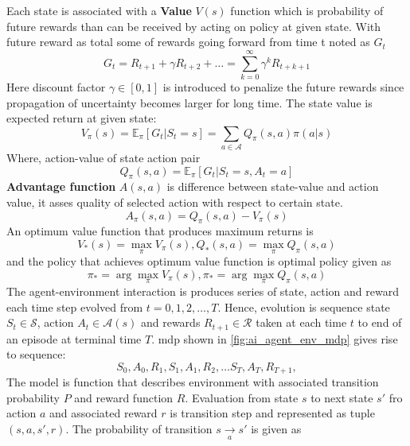 Each state is associated with a \textbf{Value} $V(s)$ function which is probability of future rewards than can be received by acting on policy at given state. With future reward as total some of rewards going forward from time t noted as $G_t$
\begin{equation}
    G_t = R_{t+1} + \gamma R_{t+2} + \dots = \sum_{k=0}^{\infty} \gamma^k R_{t+k+1}
\end{equation}
Here discount factor $\gamma \in [0,1]$ is introduced to  penalize the future rewards since propagation of uncertainty becomes larger for long time. The state value is expected return at given state:
\begin{equation}
    V_{\pi}(s) = \mathbb{E}_{\pi}[G_t \vert S_t = s] = \sum_{a \in \mathcal{A}} Q_{\pi}(s, a) \pi(a \vert s)
\end{equation}
Where, action-value of state action pair
\begin{equation}
Q_{\pi}(s, a) = \mathbb{E}_{\pi}[G_t \vert S_t = s, A_t = a]    
\end{equation}
\textbf{Advantage function} $A(s,a)$ is difference between state-value and action value, it asses quality of selected action with respect to certain state.  
\begin{equation}
    A_{\pi}(s, a) = Q_{\pi}(s, a) - V_{\pi}(s)
\end{equation}
An optimum value function that produces maximum returns is
\begin{equation}
    V_{*}(s) = \max_{\pi} V_{\pi}(s),
Q_{*}(s, a) = \max_{\pi} Q_{\pi}(s, a)
\end{equation}
and the policy that achieves optimum value function is optimal policy given as
\begin{equation}
    \pi_{*} = \arg\max_{\pi} V_{\pi}(s),
\pi_{*} = \arg\max_{\pi} Q_{\pi}(s, a)
\end{equation}
The agent-environment interaction is produces series of state, action and reward each time step evolved from $t=0,1,2,\dots,T$. Hence, evolution is sequence state $S_t \in \mathcal{S}$, action $A_t \in \mathcal{A}(s)$ and rewards $R_{t+1} \in \mathcal{R}$ taken at each time $t$ to end of an episode at terminal time $T$.
\acrlong{mdp} shown in \autoref{fig:ai_agent_env_mdp} gives rise to sequence:
\begin{equation*}
    S_0, A_0, R_1,S_1, A_1, R_2, \dots S_{T}, A_{T}, R_{T+1},
\end{equation*}
The model is function that describes environment with associated transition probability $P$ and reward function $R$. Evaluation from state $s$ to next state $s'$ fro action $a$ and associated reward $r$ is transition step and represented as tuple $(s,a,s',r)$. The probability of transition ${\displaystyle s\xrightarrow[a]{} s'}$ is given as
